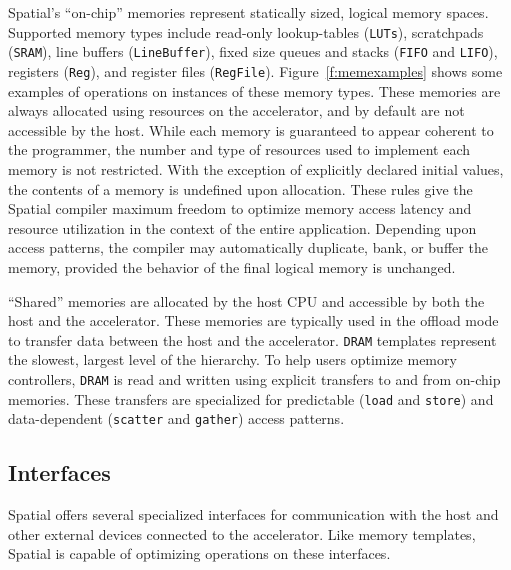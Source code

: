 Spatial's ``on-chip'' memories represent statically sized, logical memory spaces.
Supported memory types include read-only lookup-tables (\texttt{\small{LUTs}}), scratchpads (\texttt{\small{SRAM}}), line buffers (\texttt{\small{LineBuffer}}), fixed size queues and stacks (\texttt{\small{FIFO}} and \texttt{\small{LIFO}}),  registers (\texttt{\small{Reg}}), and register files (\texttt{\small{RegFile}}).
Figure~\ref{f:memexamples} shows some examples of operations on instances of these memory types.
These memories are always allocated using resources on the accelerator, and by default are not accessible by the host.
While each memory is guaranteed to appear coherent to the programmer, the number and type of resources used to implement each memory is not restricted.
With the exception of explicitly declared initial values, the contents of a memory is undefined upon allocation.
These rules give the Spatial compiler maximum freedom to optimize memory access latency and resource utilization in the context of the entire application.
Depending upon access patterns, the compiler may automatically duplicate, bank, or buffer the memory, provided the behavior of the final logical memory is unchanged.



``Shared'' memories are allocated by the host CPU and accessible by both the host and the accelerator.
These memories are typically used in the offload mode to transfer data between the host and the accelerator.
\texttt{\small{DRAM}} templates represent the slowest, largest level of the hierarchy. To help users optimize
memory controllers, \texttt{\small{DRAM}} is read and written using explicit transfers to and from on-chip memories.
These transfers are specialized for predictable (\texttt{\small{load}} and \texttt{\small{store}}) and data-dependent
(\texttt{\small{scatter}} and \texttt{\small{gather}}) access patterns.


\subsection{Interfaces}
Spatial offers several specialized interfaces for communication with the host and other external devices connected to the accelerator. Like memory templates, Spatial is capable of optimizing operations on these interfaces.

